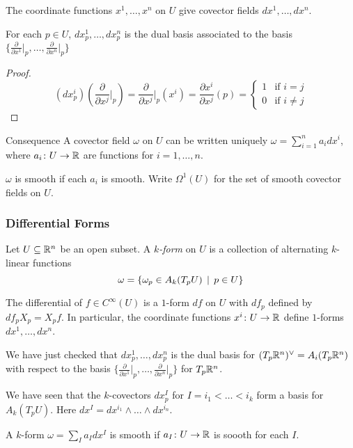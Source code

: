 \begin{frame}
  The coordinate functions $x^1, \dots, x^n$ on $U$ give covector fields
  $dx^1, \dots, dx^n$.
  \begin{prop}
    For each $p \in U$, $dx^1_p, \dots, dx^n_p$
    is the dual basis associated to the basis 
    $\{
      \frac{\partial}{\partial x^1}\vert_p
      , \dots, 
      \frac{\partial}{\partial x^n}\vert_p
    \}$
  \end{prop}
  \begin{proof}
    \begin{displaymath}
    (dx^i_p)(
      \frac{\partial}{\partial x^j}\vert_p
    )
    =
      \frac{\partial}{\partial x^j}\vert_p
    (x^i)
    =
    \frac{\partial x^i}{\partial x^j}(p) 
    =
    \begin{cases}
      1 & \text{if $i = j$} \\
      0 & \text{if $i \ne j$}
    \end{cases}
    \end{displaymath}
  \end{proof}
  \begin{block}
    {Consequence}
    A covector field $\omega$ on $U$ can be written uniquely
    $\omega = \sum_{i=1}^n a_i dx^i$,
    where $a_i \colon U \to \mathbb R$ are functions for $i = 1, \dots, n$.
  \end{block}
  \begin{defn}
    $\omega$ is smooth if each $a_i$ is smooth. Write $\Omega^1(U)$ for the set
    of smooth covector fields on $U$.
  \end{defn}
\end{frame}
\begin{frame}
  \frametitle{Differential Forms}
  \begin{defn}
    Let $U \subseteq \mathbb R^n$ be an open subset.
    A {\em $k$-form} on $U$ is a collection of alternating
    $k$-linear functions
    \begin{displaymath}
      \omega = \{\omega_p \in A_k(T_pU) \, \mid \, p \in U\}
    \end{displaymath}
  \end{defn}
  \begin{example}
    The differential of $f \in C^{\infty}(U)$ is a $1$-form $df$ on $U$ 
    with $df_p$ defined by $df_pX_p = X_p f$.
    In particular, the coordinate functions $x^i \colon U \to \mathbb R$
    define $1$-forms $dx^1, \dots, dx^n$.
  \end{example}
  We have just checked that $dx^1_p, \dots, dx^n_p$ is the dual 
  basis for $(T_p\mathbb R^n)^\vee = A_i(T_p\mathbb R^n)$ with respect to the basis
  $\{
    \frac{\partial}{\partial x^1}\vert_p
    , \dots, 
    \frac{\partial}{\partial x^n}\vert_p
  \}$
  for $T_p\mathbb R^n$.

  We have seen that the $k$-covectors $dx_p^I$ for $I = i_1 < \dots < i_k$
  form a basis for $A_k(T_p U)$. Here 
  $dx^I = dx^{i_1} \wedge \dots \wedge dx^{i_n}$.
  \begin{defn}
    A $k$-form $\omega = \sum_I a_I dx^I$ is smooth if $a_I \colon U \to \mathbb R$
    is soooth for each $I$.
  \end{defn}
\end{frame}
